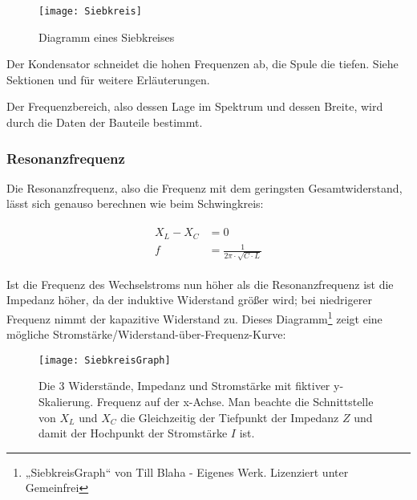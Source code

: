 \begin{figure}[h!]
	\centering
	\texttt{[image: Siebkreis]}
	\caption{Diagramm eines Siebkreises}
\end{figure}

Der Kondensator \glqq schneidet\grqq{} die hohen Frequenzen \glqq ab\grqq , die Spule die tiefen. Siehe Sektionen  und  für weitere Erläuterungen.

Der Frequenzbereich, also dessen Lage im Spektrum und dessen Breite, wird durch die Daten der Bauteile bestimmt.


\subsubsection{Resonanzfrequenz}

Die Resonanzfrequenz, also die Frequenz mit dem geringsten Gesamtwiderstand, lässt sich genauso berechnen wie beim Schwingkreis:

\begin{align}	\label{eq:ResonanzfrequenzSiebkreis}
\begin{split}
	X_L - X_C &= 0 \\
	f &= \frac{1}{2 \pi \cdot \sqrt{C \cdot L}}
\end{split}
\end{align}

Ist die Frequenz des Wechselstroms nun höher als die Resonanzfrequenz ist die Impedanz höher, da der induktive Widerstand größer wird; bei niedrigerer Frequenz nimmt der kapazitive Widerstand zu. Dieses Diagramm\footnote{„SiebkreisGraph“ von Till Blaha - Eigenes Werk. Lizenziert unter Gemeinfrei} zeigt eine mögliche Stromstärke/Widerstand-über-Frequenz-Kurve:

\begin{figure}[h!]
	\centering
	\texttt{[image: SiebkreisGraph]}
	\caption{Die 3 Widerstände, Impedanz und Stromstärke mit fiktiver y-Skalierung. Frequenz auf der x-Achse. Man beachte die Schnittstelle von $X_L$ und $X_C$ die Gleichzeitig der Tiefpunkt der Impedanz $Z$ und damit der Hochpunkt der Stromstärke $I$ ist.}
\end{figure}





